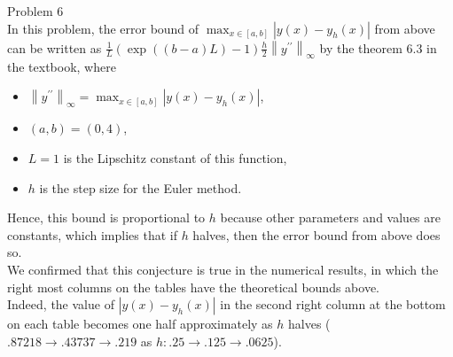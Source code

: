 \documentclass[dvipdfmx]{article}
\newcommand{\norm}[1]{\left\lVert#1\right\rVert}
\begin{document}
Problem 6\\
In this problem, the error bound of $\max_{x \in [a,b]}\left|y(x)-y_h(x)\right|$
from above can be written as 
$\frac{1}{L}\left(\exp\left((b-a)L\right) - 1\right) \frac{h}{2} \norm{y^{\prime\prime}}_{\infty}$ 
by the theorem $6.3$ in the textbook, 
where 
\begin{itemize}
  \item $\norm{y^{\prime\prime}}_{\infty} = \max_{x \in [a,b]}\left|y(x)-y_h(x)\right|$,
  \item $(a,b) = (0, 4)$,
  \item $L = 1$ is the Lipschitz constant of this function, 
  \item $h$ is the step size for the Euler method.
\end{itemize}
Hence, this bound is proportional to $h$ because other parameters and values are constants, which implies that if $h$ halves, then the error bound from above does so.\\
We confirmed that this conjecture is true in the numerical results, in which the right most columns on the tables have the theoretical bounds above.\\
Indeed, the value of $\left|y(x)-y_h(x)\right|$ in the second right column at the bottom on each table becomes one half approximately as $h$ halves ($.87218 \to .43737 \to .219$ as $h: .25 \to .125 \to .0625$).
\end{document}
